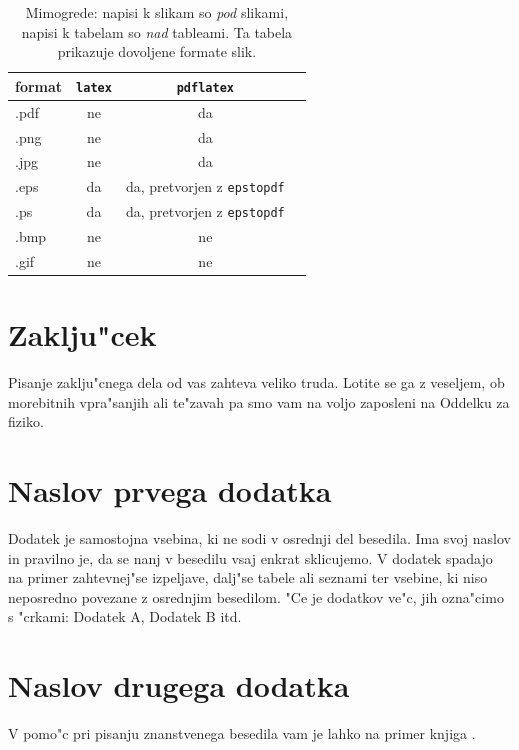 \begin{table}[h]
\caption[Dovoljeni formati slik]{Mimogrede: napisi k slikam so {\sl pod\/} slikami, 
napisi k tabelam so {\sl nad\/} tableami.  Ta tabela prikazuje
dovoljene formate slik.}
\label{tbl1}
\begin{center}
\begin{tabular}{l|ccc}
format & {\tt latex}  & {\tt pdflatex} \\ \hline
.pdf & ne  & da  \\
.png & ne  & da  \\
.jpg & ne & da  \\
.eps & da & da, pretvorjen z {\tt epstopdf} \\
.ps & da & da, pretvorjen z {\tt epstopdf}  \\
.bmp & ne & ne \\
.gif & ne & ne 
\end{tabular}
\end{center}
\end{table}


\chapter{Zaklju"cek}

Pisanje zaklju"cnega dela od vas zahteva veliko truda. 
Lotite se ga z veseljem, ob morebitnih vpra"sanjih 
ali te"zavah pa smo vam na voljo zaposleni na Oddelku za fiziko.


\cleardoublepage{}
{}




\cleardoublepage
\renewcommand\appendixname{Dodatek}
\begin{appendices}

\chapter{Naslov prvega dodatka}
    
Dodatek je samostojna vsebina, ki ne sodi v osrednji del besedila. 
Ima svoj naslov in pravilno je, da se nanj v besedilu vsaj enkrat sklicujemo.
V dodatek spadajo na primer zahtevnej"se izpeljave, dalj"se tabele 
ali seznami ter vsebine, ki niso neposredno povezane z osrednjim besedilom. 
"Ce je dodatkov ve"c, jih ozna"cimo s "crkami: Dodatek A, Dodatek B itd.

\chapter{Naslov drugega dodatka}
    
V pomo"c pri pisanju znanstvenega besedila vam je lahko na primer knjiga \cite{All}.

\end{appendices}


\cleardoublepage
\printindex

